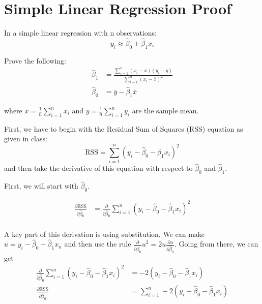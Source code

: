 \documentclass[12pt]{article}
\begin{document}
\section{Simple Linear Regression Proof}

In a simple linear regression with n observations:
\begin{equation}
    y_i \approx \hat{\beta}_0 + \hat{\beta}_1 x_i
\end{equation}

Prove the following:
\begin{align}
    \hat{\beta}_1 &= \frac{\sum_{i=1}^{n} (x_i - \bar{x}) (y_i - \bar{y})}{\sum_{i=1}^{n} (x_i - \bar{x})^2} \\
    \hat{\beta}_0 &= \bar{y} - \hat{\beta}_1 \bar{x}
\end{align}

where $\bar{x} = \frac{1}{n} \sum_{i=1}^{n}x_i$ and $\bar{y} = \frac{1}{n}\sum_{i=1}^{n}y_i$ are the sample mean.

First, we have to begin with the Residual Sum of Squares (RSS) equation as given in class:
\begin{equation}
    \text{RSS} = \sum_{i=1}^n (y_i - \hat{\beta}_0 - \hat{\beta}_1 x_i)^2
\end{equation}
and then take the derivative of this equation with respect to $\hat{\beta}_0$ and $\hat{\beta}_1$.

First, we will start with $\hat{\beta}_0$.

\begin{align}
    \frac{\partial \text{RSS}}{\partial \hat{\beta}_0} &= \frac{\partial}{\partial \hat{\beta}_0} \sum_{i=1}^n (y_i - \hat{\beta}_0 - \hat{\beta}_1 x_i)^2 \\
\end{align}

A key part of this derivation is using substitution. We can make $u = y_i - \hat{\beta}_0 - \hat{\beta}_1 x_n$ and then use the
rule $\frac{\partial}{\partial \hat{\beta}_0} u^2 = 2u \frac{\partial u}{\partial \hat{\beta}_0}$. Going from there, we can get
\begin{align}
    \frac{\partial}{\partial \hat{\beta}_0} \sum_{i=1}^n (y_i - \hat{\beta}_0 - \hat{\beta}_1 x_i)^2 &= -2(y_i - \hat{\beta}_0 - \hat{\beta}_1 x_i) \\
    \frac{\partial \text{RSS}}{\partial \hat{\beta}_0} &= \sum_{i=1}^n -2(y_i - \hat{\beta}_0 - \hat{\beta}_1 x_i) \\
\end{align}
\end{document}
